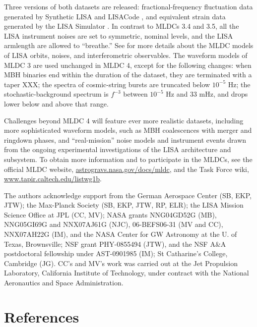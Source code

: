 \documentclass{iopart}
\begin{document}
Three versions of both datasets are released: fractional-frequency fluctuation data generated by Synthetic LISA \cite{synthlisa} and LISACode \cite{lisacode}, and equivalent strain data generated by the LISA Simulator \cite{lisasimulator}. In contrast to MLDCs 3.4 and 3.5, all the LISA instrument noises are set to symmetric, nominal levels, and the LISA armlength are allowed to ``breathe.'' See \cite{mldcgwdaw2,MLDC3} for more details about the MLDC models of LISA orbits, noises, and interferometric observables. The waveform models of MLDC 3 \cite{MLDC3} are used unchanged in MLDC 4, except for the following changes: when MBH binaries end within the duration of the dataset, they are terminated with a taper XXX; the spectra of cosmic-string bursts are truncated below $10^{-5}$ Hz; the stochastic-background spectrum is $f^{-3}$ between $10^{-5}$ Hz and 33 mHz, and drops lower below and above that range.

Challenges beyond MLDC 4 will feature ever more realistic datasets, including more sophisticated waveform models, such as MBH coalescences with merger and ringdown phases, and ``real-mission'' noise models and instrument events drawn from the ongoing experimental investigations of the LISA architecture and subsystem. To obtain more information and to participate in the MLDCs, see the official MLDC website, \url{astrogravs.nasa.gov/docs/mldc}, and the Task Force wiki, \url{www.tapir.caltech.edu/listwg1b}.

\ack
The authors acknowledge support from
the German Aerospace Center (SB, EKP, JTW);
the Max-Planck Society (SB, EKP, JTW, RP, ELR);
the LISA Mission Science Office at JPL (CC, MV);
NASA grants NNG04GD52G (MB),
  NNG05GI69G and NNX07AJ61G (NJC),
  06-BEFS06-31 (MV and CC),
  NNX07AH22G (IM),
  and the NASA Center for GW Astronomy at the U. of Texas, Brownsville;
NSF grant PHY-0855494 (JTW),
  and the NSF A\&A postdoctoral fellowship under AST-0901985 (IM);
St Catharine's College, Cambridge (JG).
CC's and MV's work was carried out at the Jet Propulsion Laboratory, California Institute of Technology, under contract with the National Aeronautics and Space Administration.

\section*{References}
\end{document}
